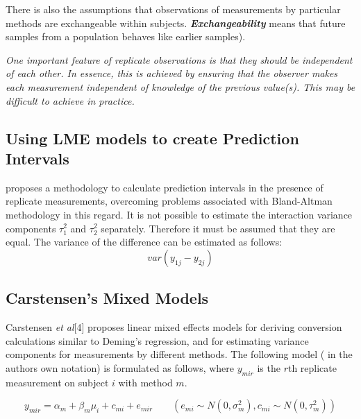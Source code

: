 \documentclass[12pt, a4paper]{report}
\theoremstyle{plain}
\theoremstyle{definition}
\theoremstyle{remark}
\begin{document}
There is also the
assumptions that observations of measurements by particular
methods are exchangeable within subjects.  \textbf{\textit{Exchangeability}} means
that future samples from a population behaves like earlier
samples).



%
\emph{
	One important feature of replicate observations is that they should be independent
	of each other. In essence, this is achieved by ensuring that the observer makes each
	measurement independent of knowledge of the previous value(s). This may be difficult
	to achieve in practice.}


\subsection*{Using LME models to create Prediction Intervals}


%

%


\cite{BXC2008} proposes a methodology to calculate prediction
intervals in the presence of replicate measurements, overcoming
problems associated with Bland-Altman methodology in this regard.
It is not possible to estimate the interaction variance components
$\tau^{2}_{1}$ and $\tau^{2}_{2}$ separately. Therefore it must be
assumed that they are equal. The variance of the difference can be
estimated as follows:
\begin{equation}
var(y_{1j}-y_{2j})
\end{equation}





\subsection{Carstensen's Mixed Models}

Carstensen \textit{et al}[4] proposes linear mixed effects models for deriving
conversion calculations similar to Deming's regression, and for
estimating variance components for measurements by different
methods. The following model ( in the authors own notation) is
formulated as follows, where $y_{mir}$ is the $r$th replicate
measurement on subject $i$ with method $m$.

\begin{equation}
y_{mir}  = \alpha_{m} + \beta_{m}\mu_{i} + c_{mi} + e_{mir} \qquad
( e_{mi} \sim N(0,\sigma^{2}_{m}), c_{mi} \sim N(0,\tau^{2}_{m}))
\end{equation}
\end{document}
